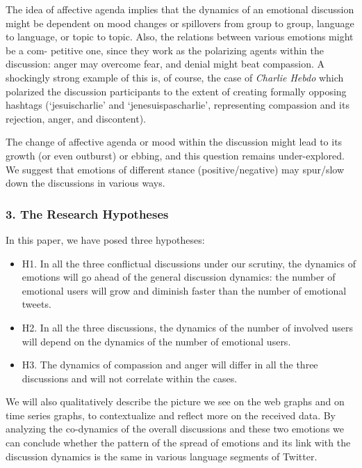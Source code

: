 The idea of affective agenda \cite{ColemanWu} implies that the dynamics of an emotional discussion might be dependent on mood changes or spillovers from group to group, language to language, or topic to topic. Also, the relations between various emotions might be a com- petitive one, since they work as the polarizing agents within the discussion: anger may overcome fear, and denial might beat compassion. A shockingly strong example of this is, of course, the case of \textit{Charlie Hebdo} which polarized the discussion participants to the extent of creating formally opposing hashtags (‘jesuischarlie’ and ‘jenesuispascharlie’, representing compassion and its rejection, anger, and discontent).

The change of affective agenda or mood within the discussion might lead to its growth (or even outburst) or ebbing, and this question remains under-explored. We suggest that emotions of different stance (positive/negative) may spur/slow down the discussions in various ways.

\subsubsection{3. The Research Hypotheses}

In this paper, we have posed three hypotheses:

\begin{itemize}
	\item H1. In all the three conflictual discussions under our scrutiny, the dynamics of emotions will go ahead of the general discussion dynamics: the number of emotional users will grow and diminish faster than the number of emotional tweets.
	\item H2. In all the three discussions, the dynamics of the number of involved users will depend on the dynamics of the number of emotional users.
	\item H3. The dynamics of compassion and anger will differ in all the three discussions and will not correlate within the cases.
\end{itemize}

We will also qualitatively describe the picture we see on the web graphs and on time series graphs, to contextualize and reflect more on the received data. By analyzing the co-dynamics of the overall discussions and these two emotions we can conclude whether the pattern of the spread of emotions and its link with the discussion dynamics is the same in various language segments of Twitter.


